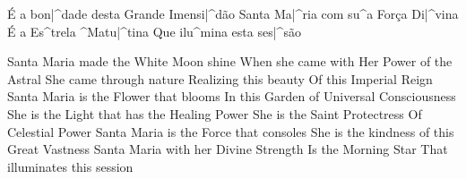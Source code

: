     É a bon|^dade desta Grande Imensi|^dão
  \endverse
  \beginchorus{}
    Santa Ma|^ria com su^a Força Di|^vina
    É a Es^trela ^Matu|^tina
    Que ilu^mina esta ses|^são
  \endchorus
  \begin{translation}
    Santa Maria made the White Moon shine
    When she came with Her Power of the Astral
    \nextverse
    She came through nature
    Realizing this beauty
    Of this Imperial Reign
    \nextverse
    Santa Maria is the Flower that blooms
    In this Garden of Universal Consciousness
    \nextverse
    She is the Light that has the Healing Power
    She is the Saint Protectress
    Of Celestial Power
    \nextverse
    Santa Maria is the Force that consoles
    She is the kindness of this Great Vastness
    \nextverse
    Santa Maria with her Divine Strength
    Is the Morning Star
    That illuminates this session

\end{translation}\]\]\]\]\]\]\]\]\]\]\]\]\]\]\]\]\]\]\]\]\]\]\]\]\]\]\]\]\]\]\]\]\]\]\]\]\]\]\]\]\]\]\]\]\]\]\]\]\]\]\]\]\]\]\]\]\]\]\]\]\]\]\]\]\]\]\]\]\]\]\]\]\]\]\]\]\]\]\]\]\]\]\]\]\]\]\]\]\]\]\]\]\]\]\]\]\]\]\]\]\]\]\]\]\]\]\]\]\]\]\]\]\]\]\]\]\]\]\]\]\]\]\]\]\]\]\]\]\]\]\]\]\]\]\]\]\]\]\]\]\]\]\]\]\]\]\]\]\]\]\]\]\]\]\]\]\]\]\]\]\]\]\]\]\]\]\]\]\]\]\]\]\]\]\]\]\]\]\]\]\]\]\]\]\]\]\]\]\]\]\]\]\]\]\]\]\]\]\]\]\]\]\]\]\]\]\]\]\]\]\]\]\]\]\]\]\]\]\]\]\]\]\]\]\]\]\]\]\]\]\]\]\]\]\]\]\]\]\]\]\]\]\]\]\]\]\]\]\]\]\]\]\]\]\]\]\]\]\]\]\]\]\]\]\]\]\]\]\]\]\]\]\]\]\]\]\]\]\]\]\]\]\]\]\]\]\]\]\]\]\]\]\]\]\]\]\]\]\]\]\]\]\]\]\]\]\]\]\]\]\]\]\]\]\]\]\]\]\]\]\]\]\]\]\]\]\]\]\]\]\]\]\]\]\]\]\]\]\]\]\]\]\]\]\]\]\]\]\]\]\]\]\]\]\]\]\]\]\]\]\]\]\]\]\]\]\]\]\]\]\]\]\]\]\]\]\]\]\]\]\]\]\]\]\]\]\]\]\]\]\]\]\]\]\]\]\]\]\]\]\]\]\]\]\]\]\]\]\]\]\]\]\]\]\]\]\]\]\]\]\]\]\]\]\]\]\]\]\]\]\]\]\]\]\]\]\]\]\]\]\]\]\]\]\]\]\]\]\]\]\]\]\]\]\]\]\]\]\]\]\]\]\]\]\]\]\]\]\]\]\]\]\]\]\]\]\]\]\]\]\]\]\]\]\]\]\]\]\]\]\]\]\]\]\]\]\]\]\]\]\]\]\]\]\]\]\]\]\]\]\]\]\]\]\]\]\]\]\]\]\]\]\]\]\]\]\]\]\]\]\]\]\]\]\]\]\]\]\]\]\]\]\]\]\]\]\]\]\]\]\]\]\]\]\]\]\]\]\]\]\]\]\]\]\]\]\]\]\]\]\]\]\]\]\]\]\]\]\]\]\]\]\]\]\]\]\]\]\]\]\]\]\]\]\]\]\]\]\]\]\]\]\]\]\]\]\]\]\]\]\]\]\]\]\]\]\]\]\]\]\]\]\]\]\]\]\]\]\]\]\]\]\]\]\]\]\]\]\]\]\]\]\]\]\]\]\]\]\]\]\]\]\]\]\]\]\]\]\]\]\]\]\]\]\]\]\]\]\]\]\]\]\]\]\]\]\]\]\]\]\]\]\]\]\]\]\]\]\]\]\]\]\]\]\]\]\]\]\]\]\]\]\]\]\]\]\]\]\]\]\]\]\]\]\]\]\]\]\]\]\]\]\]\]\]\]\]\]\]\]\]\]\]\]\]\]\]\]\]\]\]\]\]\]\]\]\]\]\]\]\]\]\]\]\]\]\]\]\]\]\]\]\]\]\]\]\]\]\]\]\]\]\]\]\]\]\]\]\]\]\]\]\]\]\]\]\]\]\]\]\]\]\]\]\]\]\]\]\]\]\]\]\]\]\]\]\]\]\]\]\]\]\]\]\]\]\]\]\]\]\]\]\]\]\]\]\]\]\]\]\]\]\]\]\]\]\]\]\]\]\]\]\]\]\]\]\]\]\]\]\]\]\]\]\]\]\]\]\]\]\]\]\]\]\]\]\]\]\]\]\]\]\]\]\]\]\]\]\]\]\]\]\]\]\]\]\]\]\]\]\]\]\]\]\]\]\]\]\]\]\]\]\]\]\]\]\]\]\]\]\]\]\]\]\]\]\]\]\]\]\]\]\]\]\]\]\]\]\]\]\]\]\]\]\]\]\]\]\]\]\]\]\]\]\]\]\]\]\]\]\]\]\]\]\]\]\]\]\]\]\]\]\]\]\]\]\]\]\]\]\]\]\]\]\]\]\]\]\]\]\]\]\]\]\]\]\]\]\]\]\]\]\]\]\]\]\]\]\]\]\]\]\]\]\]\]\]\]\]\]\]\]\]\]\]\]\]\]\]\]\]\]\]\]\]\]\]\]\]\]\]\]\]\]\]\]\]\]\]\]\]\]\]\]\]\]\]\]\]\]\]\]\]\]\]\]\]\]\]\]\]\]\]\]\]\]\]\]\]\]\]\]\]\]\]\]\]\]\]\]\]\]\]\]\]\]\]\]\]\]\]\]\]\]\]\]\]\]\]\]\]\]\]\]\]\]\]\]\]\]\]\]\]\]\]\]\]\]\]\]\]\]\]\]\]\]\]\]\]\]\]\]\]\]\]\]\]\]\]\]\]\]\]\]\]\]\]\]\]\]\]\]\]\]\]\]\]\]\]\]\]\]\]\]\]\]\]\]\]\]\]\]\]\]\]\]\]\]\]\]\]\]\]\]\]\]\]\]\]\]\]\]\]\]\]\]\]\]\]\]\]\]\]\]\]\]\]\]\]\]\]\]\]\]\]\]\]\]\]\]\]\]\]\]\]\]\]\]\]\]\]\]\]\]\]\]\]
